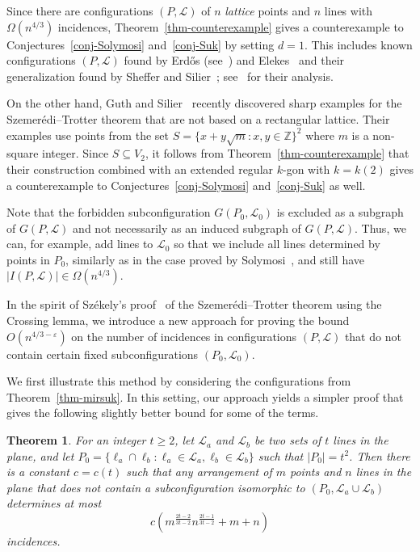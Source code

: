 \documentclass{article}
\newtheorem{theorem}{Theorem}
\begin{document}
Since there are configurations $(P,\mathcal{L})$ of $n$ \emph{lattice} points and $n$ lines with $\Omega(n^{4/3})$ incidences, Theorem~\ref{thm-counterexample} gives a counterexample to Conjectures~\ref{conj-Solymosi} and~\ref{conj-Suk} by setting $d=1$.
This includes known configurations $(P,\mathcal{L})$ found by Erd\H{o}s (see~\cite{pachAga95}) and Elekes~\cite{elekes02} and their generalization found by Sheffer and Silier~\cite{shefSil24}; see~\cite{bsr24} for their analysis.

On the other hand, Guth and Silier~\cite{guthSil23} recently discovered sharp examples for the Szemer\'{e}di--Trotter theorem that are not based on a rectangular lattice.
Their examples use points from the set $S = \{x+y\sqrt{m} \colon x,y \in \mathbb{Z}\}^2$ where $m$ is a non-square integer.
Since $S \subseteq V_2$, it follows from Theorem~\ref{thm-counterexample} that their construction combined with an extended regular $k$-gon with $k=k(2)$ gives a counterexample to Conjectures~\ref{conj-Solymosi} and~\ref{conj-Suk} as well.

Note that the forbidden subconfiguration $G(P_0,\mathcal{L}_0)$ is excluded as a subgraph of $G(P,\mathcal{L})$ and not necessarily as an induced subgraph of $G(P,\mathcal{L})$. 
Thus, we can, for example, add lines to $\mathcal{L}_0$ so that we include all lines determined by points in $P_0$, similarly as in the case proved by Solymosi~\cite{solymosi06}, and still have $|I(P,\mathcal{L})| \in \Omega(n^{4/3})$.

In the spirit of Székely's proof~\cite{Szekely} of the Szemer\'{e}di--Trotter theorem using the Crossing lemma, we introduce a new approach for proving the bound $O(n^{4/3-\varepsilon})$ on the number of incidences in configurations $(P,\mathcal{L})$ that do not contain certain fixed subconfigurations $(P_0,\mathcal{L}_0)$.

We first illustrate this method by considering the configurations from Theorem~\ref{thm-mirsuk}.
In this setting, our approach yields a simpler proof that gives the following slightly better bound for some of the terms.

\begin{theorem}
\label{thm-grids}
For an integer $t \geq 2$, let $\mathcal{L}_a$ and $\mathcal{L}_b$ be two sets of $t$ lines in the plane, and let $P_0=\{\ell_a\cap \ell_b : \ell_a\in \mathcal{L}_a, \ell_b\in \mathcal{L}_b\}$ such that $|P_0|=t^2$.
Then there is a constant $c=c(t)$ such that any arrangement of $m$ points and $n$ lines in the plane that does not contain a subconfiguration isomorphic to $(P_0,\mathcal{L}_a\cup \mathcal{L}_b)$ determines at most 
\[c(m^{\frac{2t-2}{3t-2}} n^{\frac{2t-1}{3t-2}}+m+n)\] 
incidences. 
\end{theorem}
\end{document}
